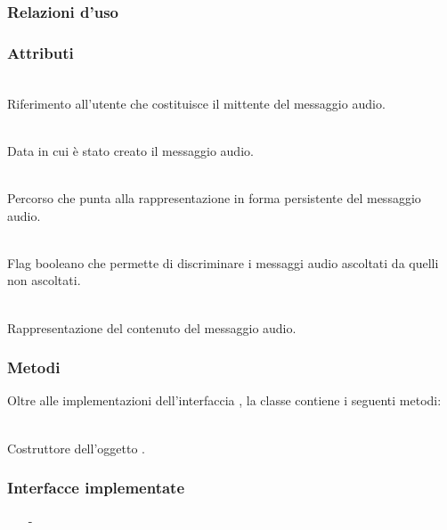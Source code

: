 \subsubsection*{Relazioni d'uso}

\subsubsection*{Attributi}
\begin{description}
  \item{}\\
Riferimento all'utente che costituisce il mittente del messaggio audio.
  \item{}\\
Data in cui è stato creato il messaggio audio.
  \item{}\\
Percorso che punta alla rappresentazione in forma persistente del messaggio audio.
  \item{}\\
Flag booleano che permette di discriminare i messaggi audio ascoltati da quelli non ascoltati.
  \item{}\\
Rappresentazione del contenuto del messaggio audio.
\end{description}

\subsubsection*{Metodi}
Oltre alle implementazioni dell'interfaccia , la classe contiene i seguenti metodi:
\begin{description}
  \item{}\\
Costruttore dell'oggetto .
\end{description}


\subsubsection*{Interfacce implementate}
\begin{itemize}[noitemsep,nolistsep]
  \item[-] 
\end{itemize}

